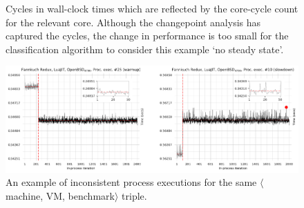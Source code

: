 \documentclass[acmlarge]{acmart}\settopmatter{printfolios=true}
\newcommand{\mvmbtrip}{$\langle$machine, VM, benchmark$\rangle$\xspace}
\begin{document}
\begin{figure}[t]
\begin{minipage}[t]{0.485\textwidth}
\caption{Cycles in wall-clock times which are reflected by the core-cycle count
for the relevant core. Although the changepoint analysis has captured the
cycles, the change in performance is too small for the classification algorithm
to consider this example `no steady state'. }
\label{fig:examples:cycles}
\end{minipage}
\end{figure}

\begin{figure}[t!]
\centering
\includegraphics[width=\textwidth]{examples/new_inconsistent.pdf}
\caption{An example of inconsistent process executions for the same \mvmbtrip triple.}
\label{fig:examples:inconsistent}
\vspace{-.4cm}
\end{figure}
\end{document}
